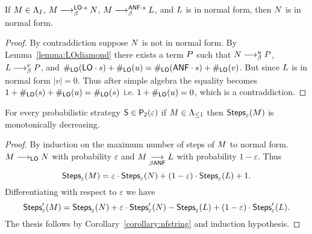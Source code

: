 \begin{corollary}\label{corollary:nfstring}
	If $M\in\Lambda_I$, $M\longrightarrow^{\textsf{LO}\cdot s}_\beta N$, $M\longrightarrow^{\mathsf{ANF}\cdot s}_\beta L$, and $L$ is in normal form, then $N$ is in normal form.
\end{corollary}
\begin{proof}
	By contraddiction suppose $N$ is not in normal form. By Lemma~\ref{lemma:LOdiamond} there exists a term $P$ such that $N\longrightarrow^{u}_\beta P$, $L\longrightarrow^{v}_\beta P$, and $\#_{\textsf{LO}}(\textsf{LO}\cdot s)+\#_{\textsf{LO}}(u)=\#_{\textsf{LO}}(\mathsf{ANF}\cdot s)+\#_{\textsf{LO}}(v)$. But since $L$ is in normal form $|v|=0$. Thus after simple algebra the equality becomes $1+ \#_{\textsf{LO}}(s)+\#_{\textsf{LO}}(u)=\#_{\textsf{LO}}(s)$ i.e. $1+\#_{\textsf{LO}}(u)=0$, which is a contraddiction.
\end{proof}
\begin{proposition}
	For every probabilistic strategy $\mathsf{S}\in\mathsf{P_2}(\varepsilon)$ if $M\in\Lambda_{\leq 1}$ then $\textsf{Steps}_{\varepsilon}(M)$ is monotonically decreasing. 
\end{proposition}
\begin{proof}
	By induction on the maximum number of steps of $M$ to normal form.\\
	$M\longrightarrow_{\textsf{LO}}N$ with probability $\varepsilon$ and $M\underset{\beta\textsf{ANF}}{\longrightarrow}L$ with probability $1-\varepsilon$. Thus
	$$
	\textsf{Steps}_{\varepsilon}(M) = \varepsilon\cdot\textsf{Steps}_{\varepsilon}(N) + (1-\varepsilon)\cdot \textsf{Steps}_{\varepsilon}(L) + 1.
	$$
	Differentiating with respect to $\varepsilon$ we have
	$$
	\textsf{Steps}_{\varepsilon}'(M) = \textsf{Steps}_{\varepsilon}(N) + \varepsilon\cdot\textsf{Steps}_{\varepsilon}'(N) -\textsf{Steps}_{\varepsilon}(L) + (1-\varepsilon)\cdot \textsf{Steps}_{\varepsilon}'(L).
	$$
	The thesis follows by Corollary~\ref{corollary:nfstring} and induction hypothesis.
\end{proof}